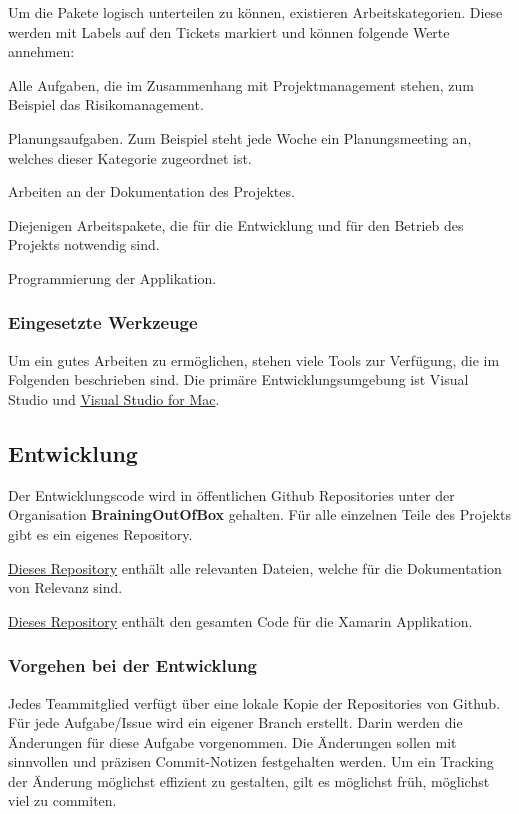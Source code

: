 Um die Pakete logisch unterteilen zu können, existieren Arbeitskategorien. Diese werden mit Labels auf den Tickets markiert und können folgende Werte annehmen:
\begin{description}[leftmargin=!,labelwidth=\widthof{\bfseries ProjektManagement}]
	\item[ProjektManagement] Alle Aufgaben, die im Zusammenhang mit Projektmanagement stehen, zum Beispiel das Risikomanagement.
	\item[Planung] Planungsaufgaben. Zum Beispiel steht jede Woche ein Planungsmeeting an, welches dieser Kategorie zugeordnet ist.
	\item[Dokumentation] Arbeiten an der Dokumentation des Projektes.
	\item[Infrastruktur] Diejenigen Arbeitspakete, die für die Entwicklung und für den Betrieb des Projekts notwendig sind.
	\item[Entwicklung] Programmierung der Applikation.
\end{description}

\subsubsection*{Eingesetzte Werkzeuge}
Um ein gutes Arbeiten zu ermöglichen, stehen viele Tools zur Verfügung, die im Folgenden beschrieben sind. Die primäre Entwicklungsumgebung ist Visual Studio und \href{https://visualstudio.microsoft.com/de/vs/mac/}{Visual Studio for Mac}.

\subsection{Entwicklung}%
Der Entwicklungscode wird in öffentlichen Github Repositories unter der Organisation \textbf{BrainingOutOfBox }gehalten. Für alle einzelnen Teile des Projekts gibt es ein eigenes Repository.

\begin{description}[leftmargin=!,labelwidth=2cm]
\item [Doc] \href{https://github.com/BrainingOutOfBox/Doc}{Dieses Repository} enthält alle relevanten Dateien, welche für die Dokumentation von Relevanz sind.
\item [App] \href{https://github.com/BrainingOutOfBox/Doc}{Dieses Repository} enthält den gesamten Code für die Xamarin Applikation.
\end{description}

\subsubsection*{Vorgehen bei der Entwicklung}
Jedes Teammitglied verfügt über eine lokale Kopie der Repositories von Github. Für jede Aufgabe/Issue wird ein eigener Branch erstellt. Darin werden die Änderungen für diese Aufgabe vorgenommen. Die Änderungen sollen mit sinnvollen und präzisen Commit-Notizen festgehalten werden. Um ein Tracking der Änderung möglichst effizient zu gestalten, gilt es möglichst früh, möglichst viel zu commiten.


